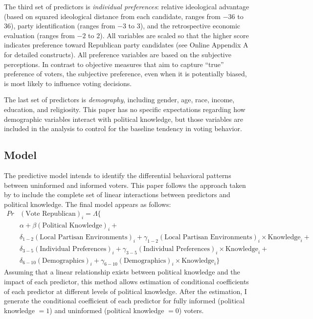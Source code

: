 \documentclass[letterpaper, 12pt]{article}
\begin{document}
    \par The third set of predictors is \textit{individual preferences}: relative ideological advantage (based on squared ideological distance from each candidate, ranges from $-36$ to $36$), party identification (ranges from $-3$ to $3$), and the retrospective economic evaluation (ranges from $-2$ to $2$). All variables are scaled so that the higher score indicates preference toward Republican party candidates (see Online Appendix A for detailed constructs). All preference variables are based on the subjective perceptions. In contrast to objective measures that aim to capture ``true'' preference of voters, the subjective preference, even when it is potentially biased, is most likely to influence voting decisions. 

    \par The last set of predictors is \textit{demography}, including gender, age, race, income, education, and religiosity. This paper has no specific expectations regarding how demographic variables interact with political knowledge, but those variables are included in the analysis to control for the baseline tendency in voting behavior. 
    
    \subsection*{Model}

    \par The predictive model intends to identify the differential behavioral patterns between uninformed and informed voters. This paper follows the approach taken by \cite{Bartels1996unvo} to include the complete set of linear interactions between predictors and political knowledge. The final model appears as follows:
    \begin{align*}
    Pr&(\text{Vote Republican})_i = \Lambda\{\\
    &\alpha + \beta (\text{Political Knowledge})_i +  \\
    &\delta_{1-2} (\text{Local Partisan Environments})_i + \gamma_{1-2} (\text{Local Partisan Environments})_i \times \text{Knowledge}_i + \\
    &\delta_{3-5} (\text{Individual Preferences})_i + \gamma_{3-5} (\text{Individual Preferences})_i \times \text{Knowledge}_i + \\
    &\delta_{6-10} (\text{Demographics})_i + \gamma_{6-10} (\text{Demographics})_i \times \text{Knowledge}_i \}
    \end{align*} 
    \noindent Assuming that a linear relationship exists between political knowledge and the impact of each predictor, this method allows estimation of conditional coefficients of each predictor at different levels of political knowledge. After the estimation, I generate the conditional coefficient of each predictor for fully informed (political knowledge $= 1$) and uninformed (political knowledge $=0$) voters.
\end{document}
